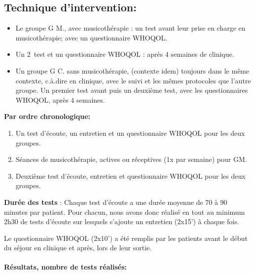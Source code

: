         	
 \subsection{Technique d'intervention:}


       
\begin{itemize}
\item Le groupe G M., avec musicothérapie : un
          test avant leur prise en charge en musicothérapie; avec un questionnaire
          WHOQOL.
          
\item Un 2\ieme\ test et un questionnaire WHOQOL : après 4 semaines de
          clinique.
          
\item Un groupe G C.  sans musicothérapie, (contexte idem)
	toujours dans le même contexte, c.à.dire en clinique, avec le suivi et les mêmes protocoles que l'autre groupe. Un premier test avant
 puis un deuxième test, avec les questionnaires WHOQOL, après 4 semaines. 
\end{itemize}

\textbf{ Par ordre chronologique:}
 
\begin{enumerate} 
   \item Un test d'écoute, un entretien et un questionnaire
        WHOQOL pour les deux groupes.
    \item Séances de musicothérapie, actives ou réceptives (1x par
        semaine) pour GM.
    \item Deuxième test d'écoute, entretien et questionnaire
          WHOQOL pour les deux groupes.
\end{enumerate}

	
	
	\textbf{Durée des tests} : Chaque test d'écoute a une durée  moyenne de
        70 à 90 minutes par patient. Pour chacun, nous avons donc réalisé
        en tout au minimum 2h30 de tests d'écoute sur lesquels
        s'ajoute un
        entretien (2x15') à chaque fois.

        
        Le questionnaire WHOQOL (2x10')  a été remplis par les
        patients avant le début du séjour en clinique et après, lors
        de leur sortie.
        
       
      
      \paragraph{Résultats, nombre de tests réalisés:}

